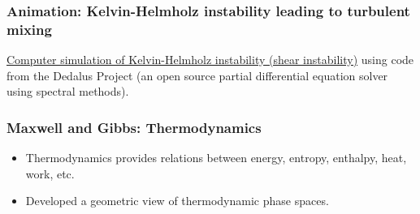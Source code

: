 \documentclass[10pt]{beamer}
\begin{document}
\begin{frame}
  \frametitle{Animation: Kelvin-Helmholz instability leading to turbulent mixing}

\begin{center}
  \href{https://vimeo.com/187121815}{Computer simulation of
    Kelvin-Helmholz instability (shear instability)} using code from
  the Dedalus Project (an open source partial differential equation
  solver using spectral methods).
\end{center}

\end{frame}



\begin{frame}
  \frametitle{Maxwell and Gibbs: Thermodynamics}

\begin{center}
\vspace{-.25cm}
\hspace{1cm}
\hspace{1cm}

\vspace{-.3cm}

\end{center}

\begin{exampleblock}{}
\begin{itemize}
\item Thermodynamics provides relations between energy, entropy,
  enthalpy, heat, work, etc.

\item Developed a geometric view of thermodynamic phase spaces.  

\end{itemize}
\end{exampleblock}{}

\end{frame}
\end{document}
